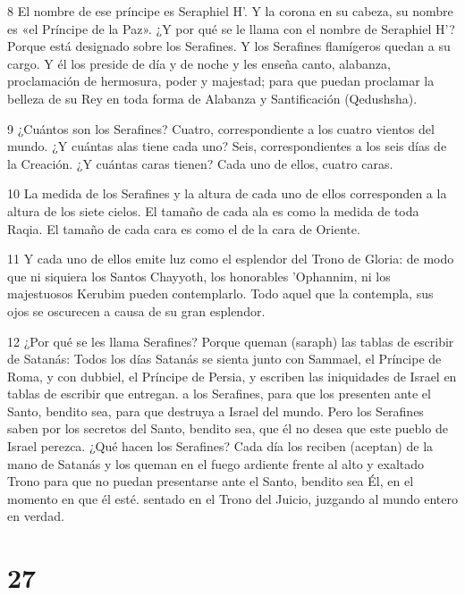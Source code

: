 \par 8 El nombre de ese príncipe es Seraphiel H'. Y la corona en su cabeza, su nombre es «el Príncipe de la Paz». ¿Y por qué se le llama con el nombre de Seraphiel H'? Porque está designado sobre los Serafines. Y los Serafines flamígeros quedan a su cargo. Y él los preside de día y de noche y les enseña canto, alabanza, proclamación de hermosura, poder y majestad; para que puedan proclamar la belleza de su Rey en toda forma de Alabanza y Santificación (Qedushsha).

\par 9 ¿Cuántos son los Serafines? Cuatro, correspondiente a los cuatro vientos del mundo. ¿Y cuántas alas tiene cada uno? Seis, correspondientes a los seis días de la Creación. ¿Y cuántas caras tienen? Cada uno de ellos, cuatro caras.

\par 10 La medida de los Serafines y la altura de cada uno de ellos corresponden a la altura de los siete cielos. El tamaño de cada ala es como la medida de toda Raqia. El tamaño de cada cara es como el de la cara de Oriente.

\par 11 Y cada uno de ellos emite luz como el esplendor del Trono de Gloria: de modo que ni siquiera los Santos Chayyoth, los honorables 'Ophannim, ni los majestuosos Kerubim pueden contemplarlo. Todo aquel que la contempla, sus ojos se oscurecen a causa de su gran esplendor.

\par 12 ¿Por qué se les llama Serafines? Porque queman (saraph) las tablas de escribir de Satanás: Todos los días Satanás se sienta junto con Sammael, el Príncipe de Roma, y ​​con dubbiel, el Príncipe de Persia, y escriben las iniquidades de Israel en tablas de escribir que entregan. a los Serafines, para que los presenten ante el Santo, bendito sea, para que destruya a Israel del mundo. Pero los Serafines saben por los secretos del Santo, bendito sea, que él no desea que este pueblo de Israel perezca. ¿Qué hacen los Serafines? Cada día los reciben (aceptan) de la mano de Satanás y los queman en el fuego ardiente frente al alto y exaltado Trono para que no puedan presentarse ante el Santo, bendito sea Él, en el momento en que él esté. sentado en el Trono del Juicio, juzgando al mundo entero en verdad.



\chapter{27}


